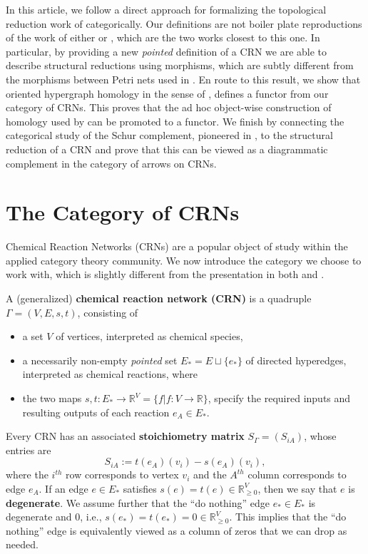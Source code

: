\documentclass[11pt, one side, article]{memoir}
\newcommand{\define}[1]{\textbf{#1}}
\newcommand{\R}{\mathbb{R}}
\begin{document}
In this article, we follow a direct approach for formalizing the topological reduction work of \cite{Hirono2021} categorically.
Our definitions are not boiler plate reproductions of the work of either \cite{spivak2015steady} or \cite{Baez_2017}, which are the two works closest to this one.
In particular, by providing a new \emph{pointed} definition of a CRN we are able to describe structural reductions using morphisms, which are subtly different from the morphisms between Petri nets used in \cite{baez2021nets}.
En route to this result, we show that oriented hypergraph homology in the sense of \cite{diestel2020homological}, defines a functor from our category of CRNs.
This proves that the ad hoc object-wise construction of homology used by \cite{Hirono2021} can be promoted to a functor.
We finish by connecting the categorical study of the Schur complement, pioneered in \cite{henselman2017matroids}, to the structural reduction of a CRN and prove that this can be viewed as a diagrammatic complement in the category of arrows on CRNs. 


\chapter{The Category of CRNs}

Chemical Reaction Networks (CRNs) are a popular object of study within the applied category theory community.
We now introduce the category we choose to work with, which is slightly different from the presentation in both \cite{Baez_2017} and \cite{Hirono2021}.

\begin{definition}\label{defn:CRN}
    A (generalized) \define{chemical reaction network (CRN)} is a quadruple $\Gamma = (V,E,s,t)$, consisting of
    \begin{itemize}
        \item a set $V$ of vertices, interpreted as chemical species,
        \item a necessarily non-empty \emph{pointed} set $E_*=E \sqcup \{e_*\}$ of directed hyperedges, interpreted as chemical reactions, where
        \item the two maps $s,t : E_{\ast} \to \mathbb{R}^V = \{f|f:V \to \mathbb{R} \}$, specify the required inputs and resulting outputs of each reaction $e_A\in E_*$.
    \end{itemize}
    Every CRN has an associated \define{stoichiometry matrix} $S_\Gamma=(S_{iA})$, whose entries are
    \[
    S_{iA}:=t(e_A)(v_i)-s(e_A)(v_i),
    \]
    where the $i^{th}$ row corresponds to vertex $v_i$ and the $A^{th}$ column corresponds to edge $e_A$.
    If an edge $e\in E_*$ satisfies $s(e)=t(e)\in \R_{\geq 0}^V$, then we say that $e$ is \define{degenerate}.
    We assume further that the ``do nothing'' edge $e_*\in E_*$ is degenerate and 0, i.e., $s(e_*)=t(e_*)=0\in \R_{\geq 0}^V$.
    This implies that the ``do nothing'' edge is equivalently viewed as a column of zeros that we can drop as needed.
\end{definition}
\end{document}
